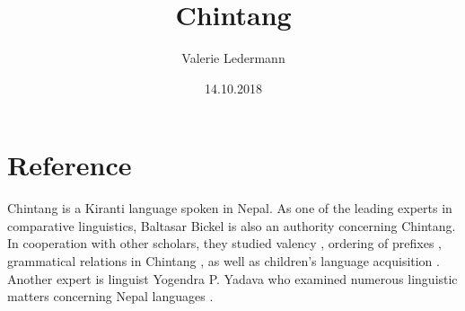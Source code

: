 \documentclass{scrartcl}
\title{Chintang}
\author{Valerie Ledermann}
\date{14.10.2018}
\begin{document}
\maketitle

\section{Reference}
Chintang is a Kiranti language spoken in Nepal. 
As one of the leading experts in comparative linguistics, Baltasar Bickel is also an authority concerning Chintang.
In cooperation with other scholars, they studied valency \citep{Schikowski2015}, ordering of prefixes \citep{Bickel2007}, grammatical relations in Chintang \citep{Bickel2008}, as well as children's language acquisition \citep{Stoll2011}.
Another expert is linguist Yogendra P. Yadava who examined numerous linguistic matters concerning Nepal languages \citeyearpar{Yadava2005}.



\end{document}
